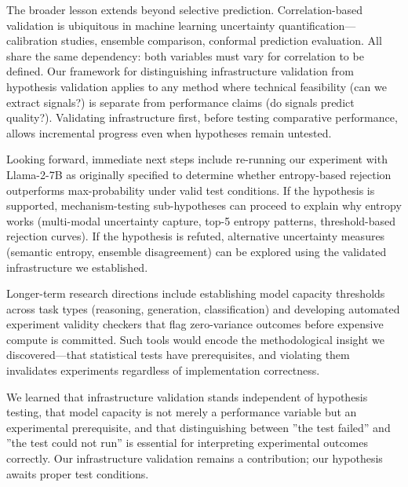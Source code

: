 The broader lesson extends beyond selective prediction. Correlation-based validation is ubiquitous in machine learning uncertainty quantification---calibration studies, ensemble comparison, conformal prediction evaluation. All share the same dependency: both variables must vary for correlation to be defined. Our framework for distinguishing infrastructure validation from hypothesis validation applies to any method where technical feasibility (can we extract signals?) is separate from performance claims (do signals predict quality?). Validating infrastructure first, before testing comparative performance, allows incremental progress even when hypotheses remain untested.

Looking forward, immediate next steps include re-running our experiment with Llama-2-7B as originally specified to determine whether entropy-based rejection outperforms max-probability under valid test conditions. If the hypothesis is supported, mechanism-testing sub-hypotheses can proceed to explain why entropy works (multi-modal uncertainty capture, top-5 entropy patterns, threshold-based rejection curves). If the hypothesis is refuted, alternative uncertainty measures (semantic entropy, ensemble disagreement) can be explored using the validated infrastructure we established.

Longer-term research directions include establishing model capacity thresholds across task types (reasoning, generation, classification) and developing automated experiment validity checkers that flag zero-variance outcomes before expensive compute is committed. Such tools would encode the methodological insight we discovered---that statistical tests have prerequisites, and violating them invalidates experiments regardless of implementation correctness.

We learned that infrastructure validation stands independent of hypothesis testing, that model capacity is not merely a performance variable but an experimental prerequisite, and that distinguishing between ''the test failed'' and ''the test could not run'' is essential for interpreting experimental outcomes correctly. Our infrastructure validation remains a contribution; our hypothesis awaits proper test conditions.
